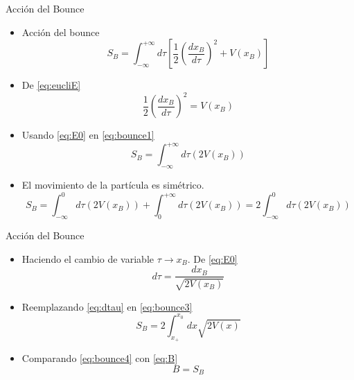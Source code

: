 \documentclass{beamer}
\theoremstyle{example}
\theoremstyle{example}
\begin{document}
\begin{frame}{Acción del Bounce}
\begin{itemize}
    \item Acción del bounce
    \begin{equation}\label{eq:bounce1}
        S_B =  \int_{-\infty}^{+\infty} d\tau \left[ \frac{1}{2}\left(\frac{dx_B}{d\tau}\right)^2 + V(x_B) \right] 
    \end{equation}
    
    \item De \eqref{eq:eucliE}
    \begin{equation}\label{eq:E0}
        \frac{1}{2}\left(\frac{dx_B}{d\tau}\right)^2 = V(x_B)
    \end{equation}
    
    \item Usando \eqref{eq:E0} en \eqref{eq:bounce1}
    \begin{equation}\label{eq:bounce2}
        S_B =   \int_{-\infty}^{+\infty} d\tau (2 V(x_B)) 
    \end{equation}
    
    \item El movimiento de la partícula es simétrico.
    \begin{equation}\label{eq:bounce3}
        S_B =  \int_{-\infty}^{0} d\tau (2 V(x_B)) + \int_{0}^{+\infty}  d\tau (2 V(x_B)) = 2 \int_{-\infty}^{0} d\tau (2 V(x_B))  
    \end{equation}
\end{itemize}
\end{frame}

\begin{frame}{Acción del Bounce}
\begin{itemize}
    \item Haciendo el cambio de variable $\tau \rightarrow x_B$. De \eqref{eq:E0}
    \begin{equation}\label{eq:dtau}
        d\tau = \frac{dx_B}{\sqrt{2V(x_B)}}
    \end{equation}
    
    \item Reemplazando \eqref{eq:dtau} en \eqref{eq:bounce3}
    \begin{equation}\label{eq:bounce4}
        S_B = 2 \int_{x_+}^{x_0} dx \sqrt{2 V(x)} 
    \end{equation}
    
    \item Comparando \eqref{eq:bounce4} con \eqref{eq:B}
    \begin{equation}
        \boxed{B = S_B}
    \end{equation}
\end{itemize}
\end{frame}
\end{document}
